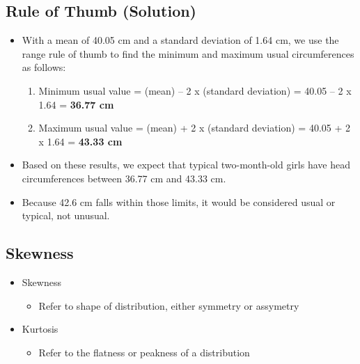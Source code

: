 \documentclass[]{article}
\providecommand{\tightlist}{%
  \setlength{\itemsep}{0pt}\setlength{\parskip}{0pt}}
\begin{document}
\hypertarget{rule-of-thumb-solution}{%
\subsection{Rule of Thumb (Solution)}\label{rule-of-thumb-solution}}

\begin{itemize}
\tightlist
\item
  With a mean of 40.05 cm and a standard deviation of 1.64 cm, we use
  the range rule of thumb to find the minimum and maximum usual
  circumferences as follows:

  \begin{enumerate}
  \def\labelenumi{\arabic{enumi}.}
  \tightlist
  \item
    Minimum usual value = (mean) -- 2 x (standard deviation) = 40.05 --
    2 x 1.64 = \textbf{36.77 cm}
  \item
    Maximum usual value = (mean) + 2 x (standard deviation) = 40.05 + 2
    x 1.64 = \textbf{43.33 cm}
  \end{enumerate}
\item
  Based on these results, we expect that typical two-month-old girls
  have head circumferences between 36.77 cm and 43.33 cm.
\item
  Because 42.6 cm falls within those limits, it would be considered
  usual or typical, not unusual.
\end{itemize}

\hypertarget{skewness}{%
\subsection{Skewness}\label{skewness}}

\begin{itemize}
\tightlist
\item
  Skewness

  \begin{itemize}
  \tightlist
  \item
    Refer to shape of distribution, either symmetry or assymetry
  \end{itemize}
\item
  Kurtosis

  \begin{itemize}
  \tightlist
  \item
    Refer to the flatness or peakness of a distribution
  \end{itemize}
\end{itemize}
\end{document}
